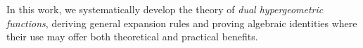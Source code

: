 \documentclass[11pt,a4paper,fleqn]{article}
\numberwithin{equation}{section}
\numberwithin{lemma}{section}
\numberwithin{theorem}{section}
\numberwithin{corollary}{section}
\begin{document}
	In this work, we systematically develop the theory of \textit{dual hypergeometric functions}, deriving general expansion rules and proving algebraic identities where their use may offer both theoretical and practical benefits. 
%
% 
% 
\end{document}
